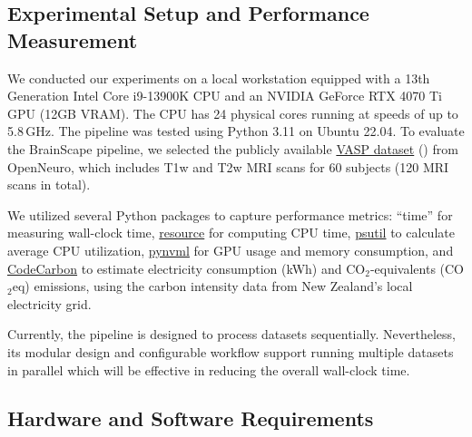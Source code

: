 \subsection{Experimental Setup and Performance Measurement}

We conducted our experiments on a local workstation equipped with a 13th Generation Intel Core i9-13900K CPU 
and an NVIDIA GeForce RTX 4070 Ti GPU (12GB VRAM). 
The CPU has 24 physical cores running at speeds of up to 5.8\,GHz. 
The pipeline was tested using Python 3.11 on Ubuntu 22.04.
To evaluate the BrainScape pipeline, 
we selected the publicly available \href{https://openneuro.org/datasets/ds003717}{VASP dataset} (\cite{peelle2022increased}) from OpenNeuro, 
which includes T1w and T2w MRI scans for 60 subjects (120 MRI scans in total). 

We utilized several Python packages to capture performance metrics: 
``time'' for measuring wall-clock time, 
\href{https://docs.python.org/3/library/resource.html}{resource} for computing CPU time,
\href{https://pypi.org/project/psutil/}{psutil} to calculate average CPU utilization, 
\href{https://pypi.org/project/pynvml/}{pynvml} for GPU usage and memory consumption, and 
\href{https://pypi.org/project/codecarbon/}{CodeCarbon} to estimate electricity consumption (kWh) and CO$_2$-equivalents (CO$_2$eq) emissions, 
using the carbon intensity data from New Zealand's local electricity grid.

Currently, the pipeline is designed to process datasets sequentially. 
Nevertheless, its modular design and configurable workflow support running multiple datasets in parallel 
which will be effective in reducing the overall wall-clock time.


\subsection{Hardware and Software Requirements}

